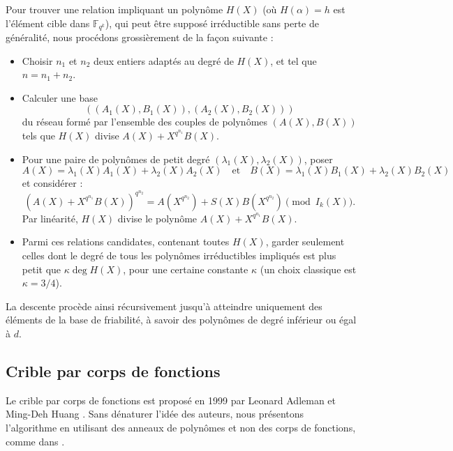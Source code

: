\documentclass[a4paper, titlepage, 11pt]{article}
\theoremstyle{definition}
\theoremstyle{remark}
\def\gf #1{\mathbb{F}_{#1}}
\begin{document}
Pour trouver une relation impliquant un polynôme $H(X)$ (où $H(\alpha) = h$ est l'élément cible dans $\gf{q^k}$), qui peut être supposé irréductible sans perte de généralité, nous procédons grossièrement de la façon suivante : \begin{itemize}
\item Choisir $n_1$ et $n_2$ deux entiers adaptés au degré de $H(X)$, et tel que $n = n_1 + n_2$.
\item Calculer une base $$((A_1(X), B_1(X)), (A_2(X), B_2(X)))$$ du réseau formé par l'ensemble des couples de polynômes $(A(X),B(X))$ tels que $H(X)$ divise $A(X) + X^{q^{n_1}}B(X)$.
\item Pour une paire de polynômes de petit degré $(\lambda_1(X), \lambda_2(X))$, poser
$$A(X) = \lambda_1(X)A_1(X) + \lambda_2(X)A_2(X) \quad\text{et}\quad B(X) = \lambda_1(X)B_1(X) + \lambda_2(X)B_2(X)$$ et considérer :
$${\left( A(X) + X^{q^{n_1}}B(X)\right)}^{q^{n_2}} = A(X^{q^{n_2}}) + S(X)B(X^{q^{n_2}}) \pmod{I_k(X)}.$$
Par linéarité, $H(X)$ divise le polynôme $A(X) + X^{q^{n_1}}B(X)$.
\item Parmi ces relations candidates, contenant toutes $H(X)$, garder seulement celles dont le degré de tous les polynômes irréductibles impliqués est plus petit que $\kappa \deg H(X)$, pour une certaine constante $\kappa$ (un choix classique est $\kappa = 3/4$).
\end{itemize}
La descente procède ainsi récursivement jusqu'à atteindre uniquement des éléments de la base de friabilité, à savoir des polynômes de degré inférieur ou égal à $d$.

\subsection{Crible par corps de fonctions}

Le crible par corps de fonctions est proposé en 1999 par Leonard Adleman et Ming-Deh Huang \cite{adleman1999}. Sans dénaturer l'idée des auteurs, nous présentons l'algorithme en utilisant des anneaux de polynômes et non des corps de fonctions, comme dans \cite{joux2013, joux2006, joux2002, pierrot2016}.
\end{document}
